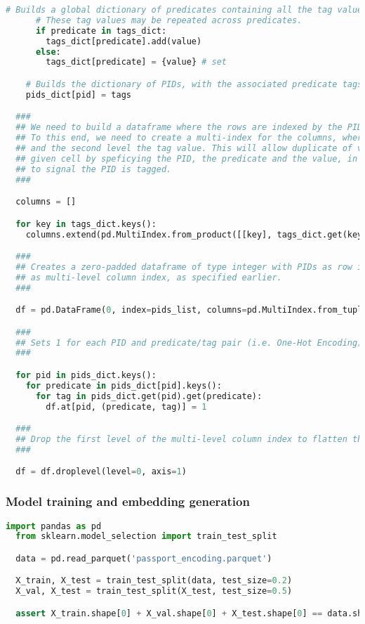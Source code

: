 \begin{lstlisting}[language=Python, caption=One-hot encoding]
      # Builds a global dictionary of predicates containing all the tag values used for all PIDs.
      # These tag values may be repeated across predicates.
      if predicate in tags_dict:
        tags_dict[predicate].add(value)
      else:
        tags_dict[predicate] = {value} # set

    # Builds the dictionary of PIDs, with the associated predicate tags
    pids_dict[pid] = tags

  ###
  ## We need to build a dataframe where the rows are indexed by the PIDs, and the columns indexed by the Passport tags.
  ## To this end, we need to create a multi-index for the columns, where the first level is the tag predicate,
  ## and the second level the tag value. This will allow duplicate of values across predicates, and access to any
  ## given cell by speficying the PID, the predicate and the value, in order for the algorithm to set the value "1"
  ## to signal the PID is tagged.
  ###

  columns = []

  for key in tags_dict.keys():
    columns.extend(pd.MultiIndex.from_product([[key], tags_dict.get(key)]))

  ###
  ## Creates a zero-padded dataframe of type integer with PIDs as row indexes and the Passport predicates and tags
  ## as multi-level column index, as specified earlier.
  ###

  df = pd.DataFrame(0, index=pids_list, columns=pd.MultiIndex.from_tuples(columns), dtype='uint8')

  ###
  ## Sets 1 for each PID and predicate/tag pair (i.e. One-Hot Encoding)
  ###

  for pid in pids_dict.keys():
    for predicate in pids_dict[pid].keys():
      for tag in pids_dict.get(pid).get(predicate):
        df.at[pid, (predicate, tag)] = 1

  ###
  ## Drop the first level of the multi-level column index to flatten the dataframe, now that it is no longer needed.
  ###

  df = df.droplevel(level=0, axis=1)
\end{lstlisting}

\subsubsection{Model training and embedding generation}

\begin{lstlisting}[language=Python, caption=Data splitting]
  import pandas as pd
  from sklearn.model_selection import train_test_split

  data = pd.read_parquet('passport_encoding.parquet')

  X_train, X_test = train_test_split(data, test_size=0.2)
  X_val, X_test = train_test_split(X_test, test_size=0.5)

  assert X_train.shape[0] + X_val.shape[0] + X_test.shape[0] == data.shape[0]
\end{lstlisting}

